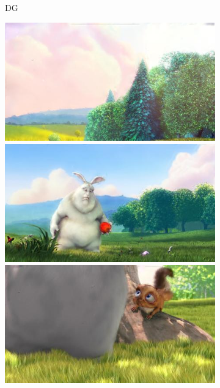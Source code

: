 \begin{figure}
\begin{subfigure}[t]{0.135\textwidth}
		\caption{DG}
	\end{subfigure}
	\begin{subfigure}[t]{0.135\textwidth}
		\includegraphics[width=\textwidth]{figures/stereo/bbb_frame-0004-8}\\
		\includegraphics[width=\textwidth]{figures/stereo/bbb_frame-0092-8}\\
		\includegraphics[width=\textwidth]{figures/stereo/bbb_frame-0124-8}\\

\end{subfigure}
\end{figure}
